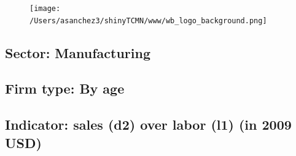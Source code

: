 \documentclass{article}\usepackage[]{graphicx}\usepackage[]{color}
\begin{document}
%

\begin{figure}
  \vspace{-3ex} %
  \hspace{-7ex} %
  \texttt{[image: /Users/asanchez3/shinyTCMN/www/wb\_logo\_background.png]}
\end{figure}
 \begin{minipage}[t]{1.1\textwidth} %
      \vspace{-30ex}
      \hspace{10ex}
  \end{minipage}
  
%
\begin{minipage}[t]{0.99\textwidth} %
  \vspace{-0.5cm}
      \subsection*{\color{white!40!black}Sector: \color{blue!40!black}Manufacturing}
      \subsection*{\color{white!40!black}Firm type: \color{blue!40!black}By age}
      \subsection*{\color{white!40!black}Indicator: \color{blue!40!black}sales (d2) over labor (l1) (in 2009 USD)}
  \end{minipage} %
\end{document}
